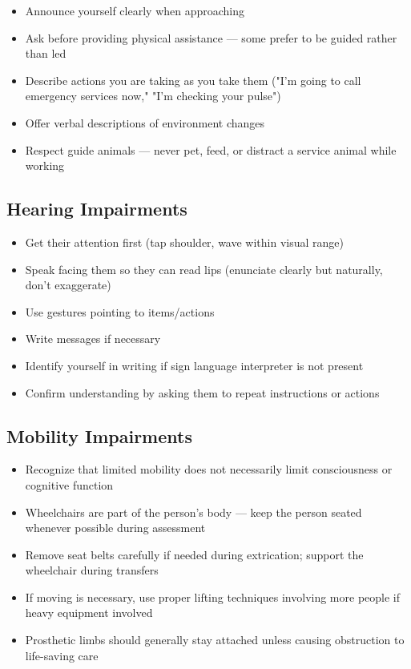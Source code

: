 \begin{itemize}[leftmargin=*]
  \item Announce yourself clearly when approaching
  \item Ask before providing physical assistance — some prefer to be guided rather than led
  \item Describe actions you are taking as you take them ("I'm going to call emergency services now," "I'm checking your pulse")
  \item Offer verbal descriptions of environment changes
  \item Respect guide animals — never pet, feed, or distract a service animal while working
\end{itemize}

\subsection{Hearing Impairments}

\begin{itemize}[leftmargin=*]
  \item Get their attention first (tap shoulder, wave within visual range)
  \item Speak facing them so they can read lips (enunciate clearly but naturally, don't exaggerate)
  \item Use gestures pointing to items/actions
  \item Write messages if necessary
  \item Identify yourself in writing if sign language interpreter is not present
  \item Confirm understanding by asking them to repeat instructions or actions
\end{itemize}

\subsection{Mobility Impairments}

\begin{itemize}[leftmargin=*]
  \item Recognize that limited mobility does not necessarily limit consciousness or cognitive function
  \item Wheelchairs are part of the person's body — keep the person seated whenever possible during assessment
  \item Remove seat belts carefully if needed during extrication; support the wheelchair during transfers
  \item If moving is necessary, use proper lifting techniques involving more people if heavy equipment involved
  \item Prosthetic limbs should generally stay attached unless causing obstruction to life-saving care
\end{itemize}

